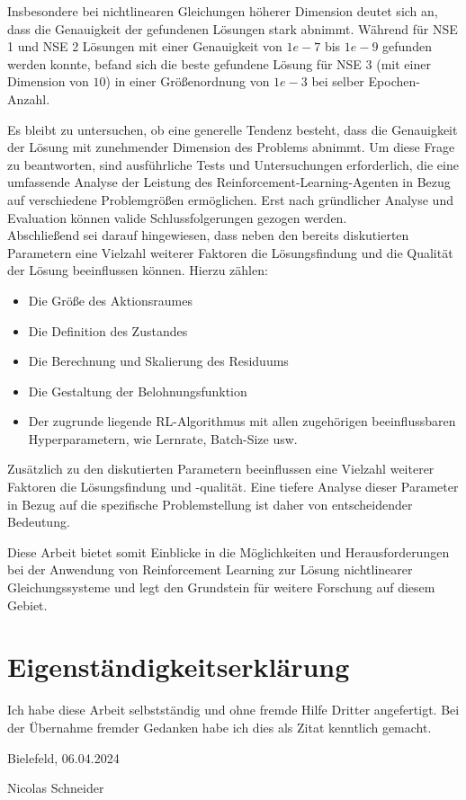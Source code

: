 \documentclass{article}
\theoremstyle{newline}
\begin{document}
\begin{onehalfspace}
Insbesondere bei nichtlinearen Gleichungen höherer Dimension deutet sich an, dass die Genauigkeit der gefundenen Lösungen stark abnimmt. Während für NSE 1 und NSE 2 Lösungen mit einer Genauigkeit von $1e-7$ bis $1e-9$ gefunden werden konnte, befand sich die beste gefundene Lösung für NSE 3 (mit einer Dimension von  $10$) in einer Größenordnung von $1e-3$ bei selber Epochen-Anzahl.

Es bleibt zu untersuchen, ob eine generelle Tendenz besteht, dass die Genauigkeit der Lösung mit zunehmender Dimension des Problems abnimmt. Um diese Frage zu beantworten, sind ausführliche Tests und Untersuchungen erforderlich, die eine umfassende Analyse der Leistung des Reinforcement-Learning-Agenten in Bezug auf verschiedene Problemgrößen ermöglichen. Erst nach gründlicher Analyse und Evaluation können valide Schlussfolgerungen gezogen werden.
\\

Abschließend sei darauf hingewiesen, dass neben den bereits diskutierten Parametern eine Vielzahl weiterer Faktoren die Lösungsfindung und die Qualität der Lösung beeinflussen können. Hierzu zählen:

\begin{itemize}
	\item Die Größe des Aktionsraumes
	\item Die Definition des Zustandes
	\item Die Berechnung und Skalierung des Residuums
	\item Die Gestaltung der Belohnungsfunktion
	\item Der zugrunde liegende RL-Algorithmus mit allen zugehörigen beeinflussbaren Hyperparametern, wie Lernrate, Batch-Size usw.
\end{itemize}

Zusätzlich zu den diskutierten Parametern beeinflussen eine Vielzahl weiterer Faktoren die Lösungsfindung und -qualität. Eine tiefere Analyse dieser Parameter in Bezug auf die spezifische Problemstellung ist daher von entscheidender Bedeutung.

Diese Arbeit bietet somit Einblicke in die Möglichkeiten und Herausforderungen bei der Anwendung von Reinforcement Learning zur Lösung nichtlinearer Gleichungssysteme und legt den Grundstein für weitere Forschung auf diesem Gebiet. 


\newpage

\clearpage %


\printbibliography

\newpage

\section{Eigenständigkeitserklärung}

Ich habe diese Arbeit selbstständig und ohne fremde Hilfe Dritter angefertigt. Bei der Übernahme fremder Gedanken habe ich dies als Zitat kenntlich gemacht. 

Bielefeld, 06.04.2024

Nicolas Schneider

\end{onehalfspace}
\end{document}
